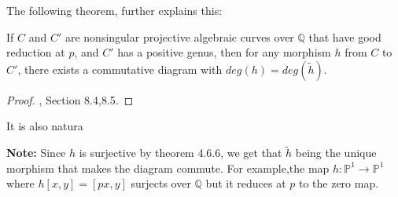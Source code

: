 The following theorem, further explains this:
\begin{theorem}
If \( C \) and \( C' \) are nonsingular projective algebraic curves over \( \mathbb{Q} \) that have good reduction at \( p \), and \( C' \) has a positive genus, then for any morphism \( h \) from \( C \) to \( C' \), there exists a commutative diagram with $deg(h)=deg(\widetilde{h})$. 
\begin{center}

\end{center}

\begin{proof}
\cite{diamond2005first}, Section 8.4,8.5. 
    
\end{proof}

It is also natura
\end{theorem}
\textbf{Note:} Since $h$ is surjective by theorem 4.6.6, we get that $\widetilde{h}$ being the unique morphism that makes the diagram commute. 
For example,the map $h: \mathbb{P}^{1} \longrightarrow \mathbb{P}^{1}$ where $h[x, y]=[p x, y]$ surjects over $\mathbb{Q}$ but it reduces at $p$ to the zero map.

